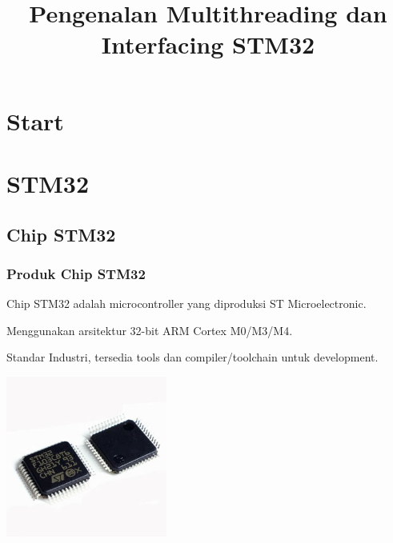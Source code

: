 \documentclass[table,dvipsnames]{beamer}
\title[STM32 Beginner Guide]{Pengenalan Multithreading dan Interfacing STM32}
\author{}
\institute[CodeDirect-FTITOS]{
	Achmadi ST MT\\
	\medskip
	\textit{}
}
\date{}
\begin{document}
	\section{Start}

	\begin{frame}
	\titlepage
	\end{frame}

	\section{STM32}
	\subsection{Chip STM32}
	\begin{frame}
		\frametitle{Produk Chip STM32}
		\begin{exampleblock}{}
			Chip STM32 adalah microcontroller yang diproduksi ST Microelectronic.
		\end{exampleblock}

		\begin{exampleblock}{}
			Menggunakan arsitektur 32-bit ARM Cortex M0/M3/M4.
		\end{exampleblock}

		\begin{exampleblock}{}
			Standar Industri, tersedia tools dan compiler/toolchain untuk development.
		\end{exampleblock}
		\begin{center}
			\includegraphics[width=150pt]{images/stm32f103c8}
		\end{center}
	\end{frame}
\end{document}
